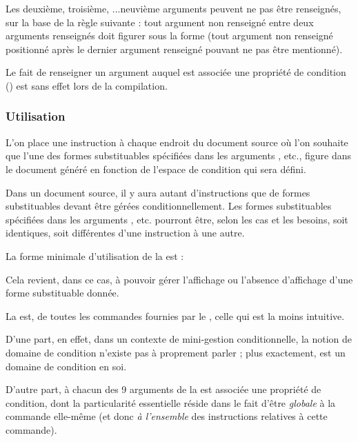\documentclass{article}
\begin{document}
Les deuxième, troisième, ...neuvième arguments peuvent ne pas être renseignés, sur la base de la règle suivante : tout argument non renseigné entre deux arguments renseignés doit figurer sous la forme \argovoid{} (tout argument non renseigné positionné après le dernier argument renseigné pouvant ne pas être mentionné).

Le fait de renseigner un argument auquel est associée une propriété de condition  () est sans effet lors de la compilation.

\subsubsection{Utilisation}

L'on place une instruction  à chaque endroit du document source où l'on souhaite que l'une des formes substituables spécifiées dans les arguments ,  etc., figure dans le document généré en fonction de l'espace de condition qui sera défini.

Dans un document source, il y aura autant d'instructions  que de formes substituables devant être gérées conditionnellement. Les formes substituables spécifiées dans les arguments ,  etc. pourront être, selon les cas et les besoins, soit identiques, soit différentes d'une instruction  à une autre.

 La forme minimale d'utilisation de la  est :


Cela revient, dans ce cas, à pouvoir gérer l'affichage ou l'absence d'affichage d'une forme substituable donnée.

La  est, de toutes les commandes fournies par le , celle qui est la moins intuitive.

D'une part, en effet, dans un contexte de mini-gestion conditionnelle, la notion de domaine de condition n'existe pas à proprement parler ; plus exactement,  est un domaine de condition en soi.

D'autre part, à chacun des 9 arguments de la  est associée une propriété de condition, dont la particularité essentielle réside dans le fait d'être \emph{globale} à la commande elle-même (et donc \emph{à l'ensemble} des instructions relatives à cette commande).
\end{document}
